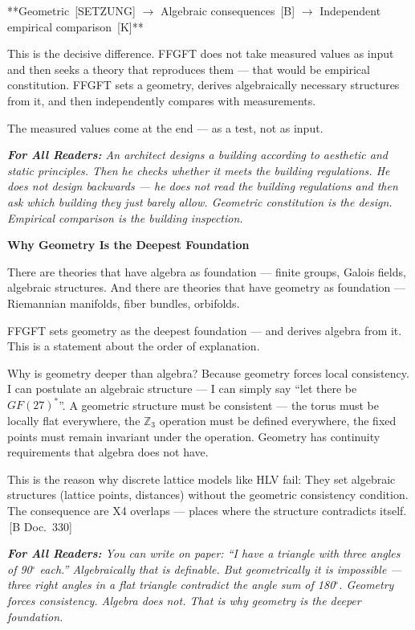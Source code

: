 \documentclass[11pt,oneside]{book}
\newcommand{\status}[1]{\penalty10000\,{\scriptsize\textcolor{gray!60}{[#1]}}}
\newenvironment{laierspur}{%
  \par\vspace{4pt}%
  \noindent\small\itshape\color{blue!60!black}%
  \textbf{For All Readers:}\enspace\ignorespaces}{%
  \par\vspace{4pt}\normalsize\normalfont\normalcolor}
\begin{document}
**Geometric \status{SETZUNG} $\to$ Algebraic consequences \status{B} $\to$ Independent
empirical comparison \status{K}**

This is the decisive difference. FFGFT does not take measured values as
input and then seeks a theory that reproduces them — that would be empirical
constitution. FFGFT sets a geometry, derives algebraically necessary
structures from it, and then independently compares with measurements.

The measured values come at the end — as a test, not as input.

\begin{laierspur}
An architect designs a building according to aesthetic and static
principles. Then he checks whether it meets the building regulations. He
does not design backwards — he does not read the building regulations and
then ask which building they just barely allow. Geometric constitution is
the design. Empirical comparison is the building inspection.
\end{laierspur}

\textbf{Why Geometry Is the Deepest Foundation}

There are theories that have algebra as foundation — finite groups, Galois
fields, algebraic structures. And there are theories that have geometry as
foundation — Riemannian manifolds, fiber bundles, orbifolds.

FFGFT sets geometry as the deepest foundation — and derives algebra from it.
This is a statement about the order of explanation.

Why is geometry deeper than algebra? Because geometry forces local
consistency. I can postulate an algebraic structure — I can simply say \enquote{let
there be $GF(27)^*$}. A geometric structure must be consistent — the torus must
be locally flat everywhere, the $\mathbb{Z}_3$ operation must be defined everywhere,
the fixed points must remain invariant under the operation. Geometry has
continuity requirements that algebra does not have.

This is the reason why discrete lattice models like HLV fail: They set
algebraic structures (lattice points, distances) without the geometric
consistency condition. The consequence are X4 overlaps — places where the
structure contradicts itself. \status{B Doc.~330}

\begin{laierspur}
You can write on paper: \enquote{I have a triangle with three angles of 90$^\circ$
each.} Algebraically that is definable. But geometrically it is impossible —
three right angles in a flat triangle contradict the angle sum of 180$^\circ$.
Geometry forces consistency. Algebra does not. That is why geometry is the
deeper foundation.
\end{laierspur}
\end{document}
